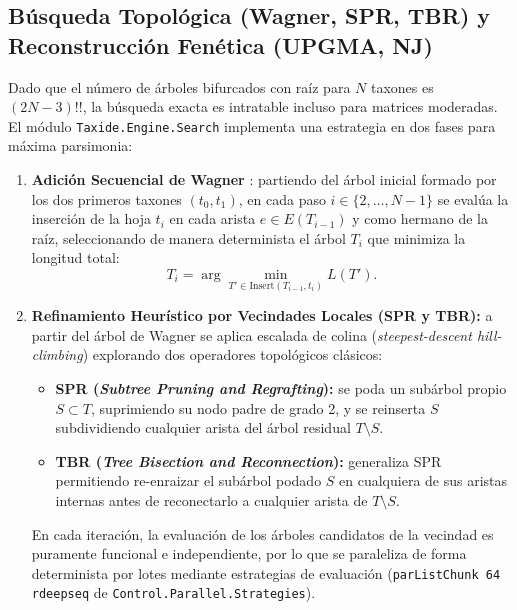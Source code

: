 \documentclass[11pt,a4paper]{article}
\theoremstyle{definition}
\theoremstyle{remark}
\begin{document}
\subsection{Búsqueda Topológica (Wagner, SPR, TBR) y Reconstrucción Fenética (UPGMA, NJ)}
\label{sec:busqueda}
Dado que el número de árboles bifurcados con raíz para $N$ taxones es $(2N - 3)!!$, la búsqueda exacta es intratable incluso para matrices moderadas. El módulo \texttt{Taxide.Engine.Search} implementa una estrategia en dos fases para máxima parsimonia:
\begin{enumerate}
    \item \textbf{Adición Secuencial de Wagner} \cite{farris1970}: partiendo del árbol inicial formado por los dos primeros taxones $(t_0, t_1)$, en cada paso $i \in \{2, \dots, N-1\}$ se evalúa la inserción de la hoja $t_i$ en cada arista $e \in E(T_{i-1})$ y como hermano de la raíz, seleccionando de manera determinista el árbol $T_i$ que minimiza la longitud total:
    \begin{equation}
    T_i = \arg\min_{T' \in \mathrm{Insert}(T_{i-1}, t_i)} L(T').
    \end{equation}
    \item \textbf{Refinamiento Heurístico por Vecindades Locales (SPR y TBR):} a partir del árbol de Wagner se aplica escalada de colina (\textit{steepest-descent hill-climbing}) explorando dos operadores topológicos clásicos:
    \begin{itemize}
        \item \textbf{SPR (\textit{Subtree Pruning and Regrafting}):} se poda un subárbol propio $S \subset T$, suprimiendo su nodo padre de grado 2, y se reinserta $S$ subdividiendo cualquier arista del árbol residual $T \setminus S$.
        \item \textbf{TBR (\textit{Tree Bisection and Reconnection}):} generaliza SPR permitiendo re-enraizar el subárbol podado $S$ en cualquiera de sus aristas internas antes de reconectarlo a cualquier arista de $T \setminus S$.
    \end{itemize}
    En cada iteración, la evaluación de los árboles candidatos de la vecindad es puramente funcional e independiente, por lo que se paraleliza de forma determinista por lotes mediante estrategias de evaluación (\texttt{parListChunk 64 rdeepseq} de \texttt{Control.Parallel.Strategies}).
\end{enumerate}
\end{document}
